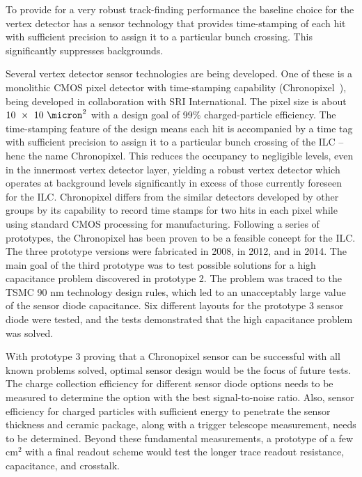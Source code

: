 To provide for a very robust track-finding performance the baseline 
choice for the vertex detector has a sensor technology that provides
time-stamping of each hit with sufficient precision to assign it to
a particular bunch crossing. This significantly suppresses
backgrounds. 


Several vertex detector sensor technologies are being developed.  One of these is a 
monolithic CMOS pixel detector with time-stamping capability (Chronopixel~\cite{Sinev:2015iwr}),
being developed in collaboration with SRI International. 
The pixel size is about  $10~\times~10~\micron^2$ with a design goal of 99\% charged-particle
 efficiency.
The time-stamping feature of the design means each hit is accompanied by a time tag with sufficient precision to assign it to a particular bunch crossing of
the ILC -- henc the name Chronopixel. This reduces the occupancy to negligible levels, even in the
innermost vertex detector layer, yielding a robust vertex detector which operates at background
levels significantly in excess of those currently foreseen for the ILC. Chronopixel differs from the
similar detectors developed by other groups by its capability to record time stamps for two hits in
each pixel while using standard CMOS processing for manufacturing. 
Following a series of prototypes, the Chronopixel has been proven to be
a feasible concept for the ILC. The three prototype versions
were fabricated in 2008, in 2012, and in 2014.
The main goal of the third prototype was to test possible solutions for a high capacitance problem
discovered in prototype 2. The problem was traced to the TSMC 90 nm technology design rules,
which led to an unacceptably large value of the sensor diode capacitance. Six different layouts
for the prototype 3 sensor diode were tested, and the tests demonstrated that the high capacitance
problem was solved.

With prototype 3 proving that a Chronopixel sensor can be successful with all known problems solved, optimal sensor design would be the focus of future tests.
The charge collection efficiency for different sensor diode options needs to be measured to determine
the option with the best signal-to-noise ratio. Also, sensor efficiency for charged particles with sufficient energy to penetrate the sensor thickness and ceramic package, along with a trigger telescope measurement, needs to be determined. Beyond these fundamental measurements, a prototype of a few cm$^2$ with a final readout scheme would
test the longer trace readout resistance, capacitance, and crosstalk.


